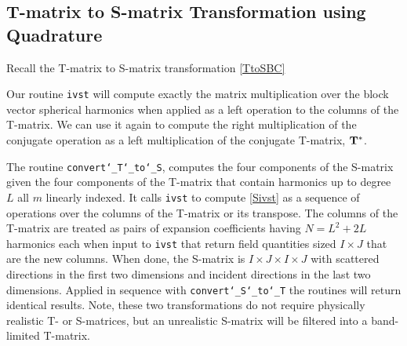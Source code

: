 {\footnotesize
{}
}



\subsection{T-matrix to S-matrix Transformation using Quadrature}
\label{fastTtoS}

Recall the T-matrix to S-matrix transformation \eqref{TtoSBC}

Our routine \texttt{ivst} will compute exactly the matrix multiplication over the block vector spherical harmonics when applied as a left operation to the columns of the T-matrix. We can use it again to compute the right multiplication of the conjugate operation as a left multiplication of the conjugate T-matrix, $\mathbf{T}^*$.

The routine \texttt{convert\char`_T\char`_to\char`_S}, computes the four components of the S-matrix given the four components of the T-matrix that contain harmonics up to degree $L$ all $m$ linearly indexed. It calls \texttt{ivst} to compute \eqref{Sivst} as a sequence of operations over the columns of the T-matrix or its transpose. The columns of the T-matrix are treated as pairs of expansion coefficients having $N = L^2 + 2L$ harmonics each when input to \texttt{ivst} that return field quantities sized $I \times J$ that are the new columns. When done, the S-matrix is $I \times J \times I \times J$ with scattered directions in the first two dimensions and incident directions in the last two dimensions.  Applied in sequence with \texttt{convert\char`_S\char`_to\char`_T} the routines will return identical results. Note, these two transformations do not require physically realistic T- or S-matrices, but an unrealistic S-matrix will be filtered into a band-limited T-matrix.   %


